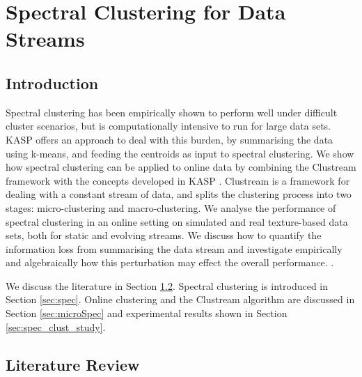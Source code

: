% 
 \setpagewiselinenumbers
 \linenumbers
\graphicspath{{Chapter3/figures/}} 

\chapter{Spectral Clustering for Data Streams}

\section{Introduction}

Spectral clustering has been empirically shown to perform well under difficult cluster scenarios, but is computationally intensive to run for large data sets. KASP offers an approach to deal with this burden, by summarising the data using k-means, and feeding the centroids as input to spectral clustering. We show how spectral clustering can be applied to online data by combining the Clustream framework with the concepts developed in KASP \cite{Yan2009}. Clustream is a framework for dealing with a constant stream of data, and splits the clustering process into two stages: micro-clustering and macro-clustering. We analyse the performance of spectral clustering in an online setting on simulated and real texture-based data sets, both for static and evolving streams. We discuss how to quantify the information loss from summarising the data stream and investigate empirically and algebraically how this perturbation may effect the overall performance. . 

We discuss the literature in Section \ref{sec:spec_lit}. Spectral clustering is introduced in Section \ref{sec:spec}. Online clustering and the Clustream algorithm are discussed in Section \ref{sec:microSpec} and experimental results shown in Section \ref{sec:spec_clust_study}.


\section{Literature Review}
\label{sec:spec_lit}

